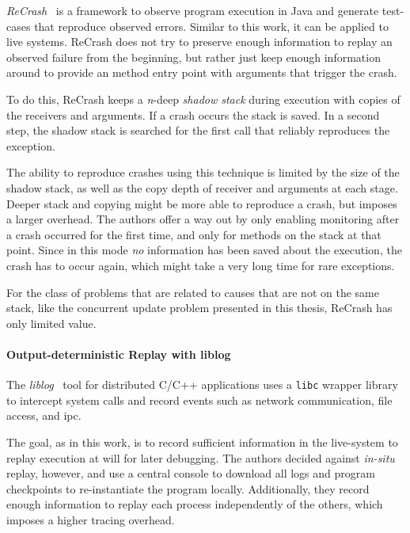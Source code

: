 \emph{ReCrash}~\cite{Artzi} is a framework to observe program execution in
Java and generate test-cases that reproduce observed errors. Similar
to this work, it can be applied to live systems. ReCrash does not try
to preserve enough information to replay an observed failure from the
beginning, but rather just keep enough information around to provide
an method entry point with arguments that trigger the crash.

To do this, ReCrash keeps a \emph{n}-deep \emph{shadow stack} during
execution with copies of the receivers and arguments. If a crash
occurs the stack is saved. In a second step, the shadow stack is
searched for the first call that reliably reproduces the exception.

The ability to reproduce crashes using this technique is limited by
the size of the shadow stack, as well as the copy depth of receiver
and arguments at each stage. Deeper stack and copying might be more
able to reproduce a crash, but imposes a larger overhead. The authors
offer a way out by only enabling monitoring after a crash occurred for
the first time, and only for methods on the stack at that point. Since
in this mode \emph{no} information has been saved about the execution,
the crash has to occur again, which might take a very long time for
rare exceptions.

For the class of problems that are related to causes that are not on
the same stack, like the concurrent update problem presented in this
thesis, ReCrash has only limited value.

\paragraph{Output-deterministic Replay with liblog}
\label{sec:liblog}

The \emph{liblog}~\cite{Geels2006Replay} tool for distributed C/C++
applications uses a {\tt libc} wrapper library to intercept system
calls and record events such as network communication, file access,
and \ac{ipc}.

The goal, as in this work, is to record sufficient information in the
live-system to replay execution at will for later debugging. The
authors decided against \emph{in-situ} replay, however, and use a
central console to download all logs and program checkpoints to
re-instantiate the program locally. Additionally, they record enough
information to replay each process independently of the others, which
imposes a higher tracing overhead.

